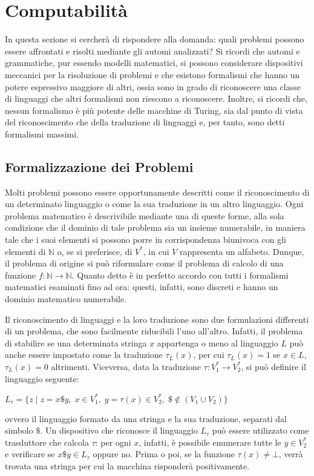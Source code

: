 \chapter{Computabilità}
  In questa sezione si cercherà di rispondere alla domanda: quali problemi possono essere affrontati e risolti mediante gli automi analizzati?
  Si ricordi che automi e grammatiche, pur essendo modelli matematici, si possono considerare dispositivi meccanici per la risoluzione di problemi e che esistono formalismi che hanno un potere espressivo maggiore di altri, ossia sono in grado di riconoscere una classe di linguaggi che altri formalismi non riescono a riconoscere. Inoltre, si ricordi che, nessun formalismo è più potente delle macchine di Turing, sia dal punto di vista del riconoscimento che della traduzione di linguaggi e, per tanto, sono detti formalismi massimi.

  \section{Formalizzazione dei Problemi}
  Molti problemi possono essere opportunamente descritti come il riconoscimento di un determinato linguaggio o come la sua traduzione in un altro linguaggio. Ogni problema matematico è descrivibile mediante una di queste forme, alla sola condizione che il dominio di tale problema sia un insieme numerabile, in maniera tale che i suoi elementi si possono porre in corrispondenza biunivoca con gli elementi di \(\mathbb N\) o, se si preferisce, di \(V^*\), in cui \(V\) rappresenta un alfabeto. Dunque, il problema di origine si può riformulare come il problema di calcolo di una funzione \(f:\mathbb N\to\mathbb N\). Quanto detto è in perfetto accordo con tutti i formalismi matematici esaminati fino ad ora: questi, infatti, sono discreti e hanno un dominio matematico numerabile.

  Il riconoscimento di linguaggi e la loro traduzione sono due formulazioni differenti di un problema, che sono facilmente riducibili l'uno all'altro. Infatti, il problema di stabilire se una determinata stringa \(x\) appartenga o meno al linguaggio \(L\) può anche essere impostato come la traduzione \(\tau_L(x)\), per cui \(\tau_L(x) = 1\) se \(x\in L\), \(\tau_L(x)=0\) altrimenti. Viceversa, data la traduzione \(\tau:V_1^*\to V_2^*\), si può definire il linguaggio seguente:
  
  \(L_{\tau}=\{z\;|\;z=x\$y,\; x\in V_1^*,\; y=\tau(x)\in V_2^*,\; \$ \notin (V_1\cup V_2)\} \)
  
  \noindent ovvero il linguaggio formato da una stringa e la sua traduzione, separati dal simbolo \(\$\). Un dispositivo che riconosce il linguaggio \(L_{\tau}\) può essere utilizzato come trasduttore che calcola \(\tau\): per ogni \(x\), infatti, è possibile enumerare tutte le \(y\in V_2^*\) e verificare se \(x\$y\in L_{\tau}\) oppure no. Prima o poi, se la funzione \(\tau(x)\neq \bot \), verrà trovata una stringa per cui la macchina risponderà positivamente.


